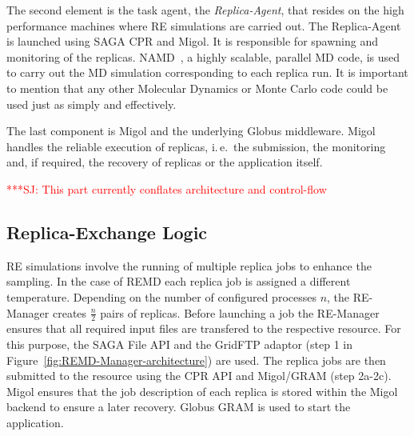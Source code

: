 \documentclass{rspublic}
\newcommand{\alnote}[1]{ {\textcolor{blue} { ***AL: #1 }}}
\newcommand{\jhanote}[1]{ {\textcolor{red} { ***SJ: #1 }}}
\newcommand{\alnote}[1]{}
\newcommand{\jhanote}[1]{}
\newcommand{\replicaagent}[1]{Replica-Agent }
\newcommand{\remanager}[1]{RE-Manager }
\begin{document}
The second element is the task agent, the \textit{Replica-Agent},
that resides on the high performance machines where RE simulations
are carried out. The \replicaagent\ is launched using SAGA CPR and Migol.
It is responsible for spawning and monitoring of the replicas. 
NAMD~\citep{Phillips:2005gd}, a highly scalable, parallel MD
code, is used to carry out the MD simulation corresponding to each
replica run. It is important to mention that any other Molecular Dynamics 
or Monte Carlo code could be used just as simply and effectively.

The last component is Migol and the underlying Globus middleware. 
Migol handles the reliable execution of replicas, i.\,e.\ the submission,
the monitoring and, if required, the recovery of replicas or the application itself.


                                  

\jhanote{This part currently conflates architecture and control-flow}
                       
\subsection{Replica-Exchange Logic}
                                            
RE simulations involve the running of multiple replica jobs to enhance the sampling. 
In the case of REMD each replica job is assigned a different temperature.  
Depending on the number of configured processes $n$, the \remanager\
creates $\frac{n}{2}$ pairs of replicas.
Before launching a job the \remanager\ ensures that all required input 
files are transfered to the respective resource. For this purpose, the SAGA File API and the
GridFTP adaptor (step 1 in Figure~\ref{fig:REMD-Manager-architecture})
are used.  The replica jobs are then submitted to the resource
using the CPR API and Migol/GRAM (step 2a-2c). Migol ensures that the
job description of each replica is stored within the Migol backend
to ensure a later recovery. Globus GRAM is used to start the
application.
\end{document}
